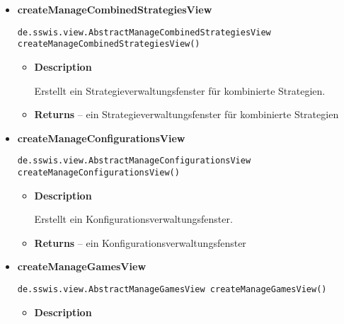 {{{{\begin{itemize}
{\begin{itemize}
{Erstellt ein Hauptfenster.
}
\item{{\bf  Returns} -- 
ein Hauptfenster 
}%
\end{itemize}
}%
\item{ 
\hypertarget{de.sswis.controller.AbstractGuiFactory.createManageCombinedStrategiesView()}{{\bf  createManageCombinedStrategiesView}\\}
\begin{lstlisting}[frame=none]
de.sswis.view.AbstractManageCombinedStrategiesView createManageCombinedStrategiesView()\end{lstlisting} %
\begin{itemize}
\item{
{\bf  Description}

Erstellt ein Strategieverwaltungsfenster für kombinierte Strategien.
}
\item{{\bf  Returns} -- 
ein Strategieverwaltungsfenster für kombinierte Strategien 
}%
\end{itemize}
}%
\item{ 
\hypertarget{de.sswis.controller.AbstractGuiFactory.createManageConfigurationsView()}{{\bf  createManageConfigurationsView}\\}
\begin{lstlisting}[frame=none]
de.sswis.view.AbstractManageConfigurationsView createManageConfigurationsView()\end{lstlisting} %
\begin{itemize}
\item{
{\bf  Description}

Erstellt ein Konfigurationsverwaltungsfenster.
}
\item{{\bf  Returns} -- 
ein Konfigurationsverwaltungsfenster 
}%
\end{itemize}
}%
\item{ 
\hypertarget{de.sswis.controller.AbstractGuiFactory.createManageGamesView()}{{\bf  createManageGamesView}\\}
\begin{lstlisting}[frame=none]
de.sswis.view.AbstractManageGamesView createManageGamesView()\end{lstlisting} %
\begin{itemize}
\item{
{\bf  Description}

}
\end{itemize}}
\end{itemize}}}}}
